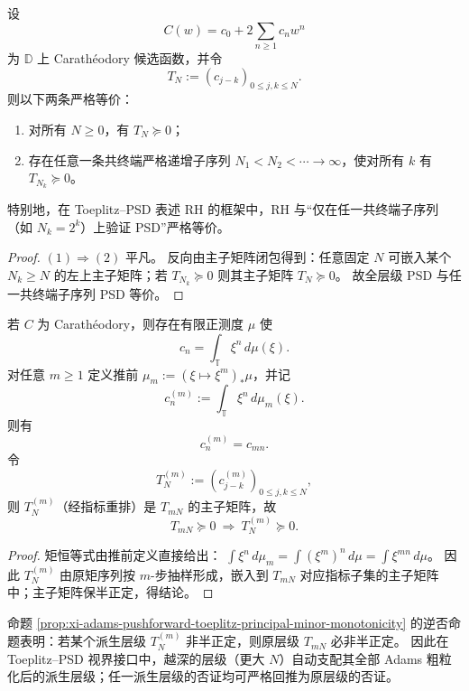 \begin{theorem}\label{thm:xi-toeplitz-psd-cofinal-sparsification}
设
\[
C(w)=c_0+2\sum_{n\ge 1}c_n w^n
\]
为 \(\mathbb D\) 上 Carath\'eodory 候选函数，并令
\[
T_N:=(c_{j-k})_{0\le j,k\le N}.
\]
则以下两条严格等价：
\begin{enumerate}
  \item 对所有 \(N\ge 0\)，有 \(T_N\succeq 0\)；
  \item 存在任意一条共终端严格递增子序列 \(N_1<N_2<\cdots\to\infty\)，使对所有 \(k\) 有 \(T_{N_k}\succeq 0\)。
\end{enumerate}
特别地，在 Toeplitz--PSD 表述 RH 的框架中，RH 与“仅在任一共终端子序列（如 \(N_k=2^k\)）上验证 PSD”严格等价。
\end{theorem}

\begin{proof}
\((1)\Rightarrow(2)\) 平凡。
反向由主子矩阵闭包得到：任意固定 \(N\) 可嵌入某个 \(N_k\ge N\) 的左上主子矩阵；若 \(T_{N_k}\succeq 0\) 则其主子矩阵 \(T_N\succeq 0\)。
故全层级 PSD 与任一共终端子序列 PSD 等价。
\end{proof}



\begin{proposition}\label{prop:xi-adams-pushforward-toeplitz-principal-minor-monotonicity}
若 \(C\) 为 Carath\'eodory，则存在有限正测度 \(\mu\) 使
\[
c_n=\int_{\mathbb T}\xi^n\,d\mu(\xi).
\]
对任意 \(m\ge 1\) 定义推前 \(\mu_m:=(\xi\mapsto \xi^m)_\ast\mu\)，并记
\[
c_n^{(m)}:=\int_{\mathbb T}\xi^n\,d\mu_m(\xi).
\]
则有
\[
c_n^{(m)}=c_{mn}.
\]
令
\[
T_N^{(m)}:=(c^{(m)}_{j-k})_{0\le j,k\le N},
\]
则 \(T_N^{(m)}\)（经指标重排）是 \(T_{mN}\) 的主子矩阵，故
\[
T_{mN}\succeq 0\ \Longrightarrow\ T_N^{(m)}\succeq 0.
\]
\end{proposition}

\begin{proof}
矩恒等式由推前定义直接给出：
\(
\int \xi^n\,d\mu_m=\int (\xi^m)^n\,d\mu=\int \xi^{mn}\,d\mu
\)。
因此 \(T_N^{(m)}\) 由原矩序列按 \(m\)-步抽样形成，嵌入到 \(T_{mN}\) 对应指标子集的主子矩阵中；主子矩阵保半正定，得结论。
\end{proof}

\begin{remark}\label{rem:xi-adams-toeplitz-no-info-increase}
命题 \ref{prop:xi-adams-pushforward-toeplitz-principal-minor-monotonicity} 的逆否命题表明：若某个派生层级 \(T_N^{(m)}\) 非半正定，则原层级 \(T_{mN}\) 必非半正定。
因此在 Toeplitz--PSD 视界接口中，越深的层级（更大 \(N\)）自动支配其全部 Adams 粗粒化后的派生层级；任一派生层级的否证均可严格回推为原层级的否证。
\end{remark}

